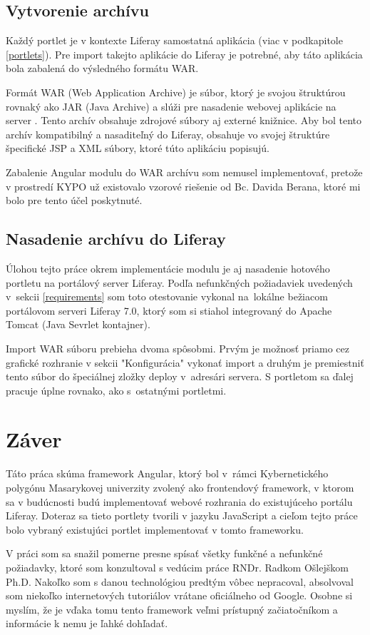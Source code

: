 \documentclass[
  printed, %
  twoside, %
  notable,   %
  nolof,   %
  nolot,   %
]{fithesis3}
\newcommand{\inquotes}[1]{{}"{}#1{}"{}}
\begin{document}
\section{Vytvorenie archívu}
Každý portlet je v kontexte Liferay samostatná aplikácia (viac v podkapitole \ref{portlets}). Pre import takejto aplikácie do Liferay je potrebné, aby táto aplikácia bola zabalená do výsledného formátu WAR.

Formát WAR (Web Application Archive) je súbor, ktorý je svojou štruktúrou rovnaký ako JAR (Java Archive) a slúži pre nasadenie webovej aplikácie na server \cite{javaWorld}. Tento archív obsahuje zdrojové súbory aj externé knižnice. Aby bol tento archív kompatibilný a nasaditeľný do Liferay, obsahuje vo svojej štruktúre špecifické JSP a XML súbory, ktoré túto aplikáciu popisujú.

Zabalenie Angular modulu do WAR archívu som nemusel implementovať, pretože v prostredí KYPO už existovalo vzorové riešenie od Bc. Davida Berana, ktoré mi bolo pre tento účel poskytnuté.

\section{Nasadenie archívu do Liferay}
Úlohou tejto práce okrem implementácie modulu je aj nasadenie hotového portletu na portálový server Liferay. Podľa nefunkčných požiadaviek uvedených v~sekcii \ref{requirements} som toto otestovanie vykonal na~lokálne bežiacom portálovom serveri Liferay 7.0, ktorý som si stiahol integrovaný do Apache Tomcat (Java Sevrlet kontajner).

Import WAR súboru prebieha dvoma spôsobmi. Prvým je možnosť priamo cez grafické rozhranie v sekcii \inquotes{Konfigurácia} vykonať import a druhým je premiestniť tento súbor do špeciálnej zložky deploy v~adresári servera. S portletom sa ďalej pracuje úplne rovnako, ako s~ostatnými portletmi.

\chapter{Záver}
Táto práca skúma framework Angular, ktorý bol v~rámci Kybernetického polygónu Masarykovej univerzity zvolený ako frontendový framework, v ktorom sa v budúcnosti budú implementovať webové rozhrania do existujúceho portálu Liferay. Doteraz sa tieto portlety tvorili v jazyku JavaScript a cieľom tejto práce bolo vybraný existujúci portlet implementovať v tomto frameworku.

V práci som sa snažil pomerne presne spísať všetky funkčné a nefunkčné požiadavky, ktoré som konzultoval s vedúcim práce RNDr. Radkom Ošlejškom Ph.D. Nakoľko som s danou technológiou predtým vôbec nepracoval, absolvoval som niekoľko internetových tutoriálov vrátane oficiálneho od Google. Osobne si myslím, že je vďaka tomu tento framework veľmi prístupný začiatočníkom a informácie k nemu je ľahké dohľadať.
\end{document}
